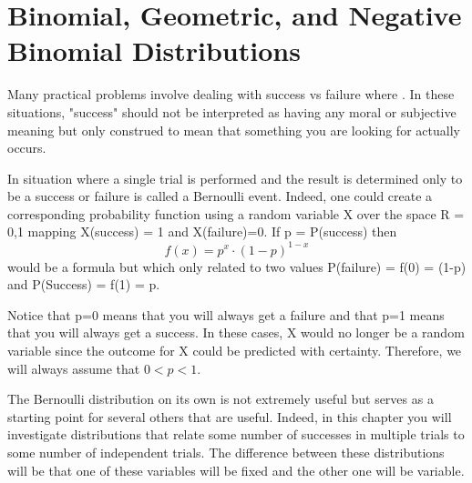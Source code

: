 \documentclass[10pt,]{book}
\theoremstyle{plain}
\theoremstyle{definition}
\theoremstyle{definition}
\theoremstyle{definition}
\numberwithin{equation}{section}
\begin{document}
\chapter[{Binomial, Geometric, and Negative Binomial Distributions}]{Binomial, Geometric, and Negative Binomial Distributions}\label{chapter-7}
\typeout{************************************************}
\typeout{************************************************}
Many practical problems involve dealing with success vs failure where . In these situations, "success" should not be interpreted as having any moral or subjective meaning but only construed to mean that something you are looking for actually occurs.%
\par
In situation where a single trial is performed and the result is determined only to be a success or failure is called a Bernoulli event. Indeed, one could create a corresponding probability function using a random variable X over the space R = {0,1} mapping X(success) = 1 and X(failure)=0. If p = P(success) then 
	\begin{equation*}f(x) = p^x \cdot (1-p)^{1-x}\end{equation*}
	would be a formula but which only related to two values P(failure) = f(0) = (1-p) and P(Success) = f(1) = p.  
\par
Notice that p=0 means that you will always get a failure and that p=1 means that you will always get a success. In these cases, X would no longer be a random variable since the outcome for X could be predicted with certainty. Therefore, we will always assume that \(0 < p < 1\).
\par

	The Bernoulli distribution on its own is not extremely useful but serves as a starting point for several others that are useful.  Indeed, in this chapter you will investigate distributions that relate some number of successes in multiple trials to some number of independent trials. The difference between these distributions will be that one of these variables will be fixed and the other one will be variable.
%
\typeout{************************************************}
\typeout{************************************************}
\end{document}
